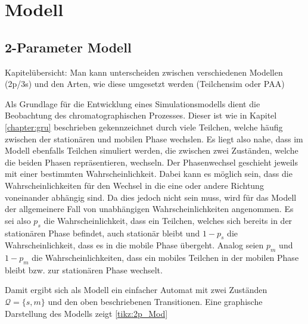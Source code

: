 \chapter{Modell} %
\label{chapter:mod}

\section{2-Parameter Modell}
\label{chapter:mod:2p}


Kapitelübersicht: Man kann unterscheiden zwischen verschiedenen Modellen (2p/3s) und den Arten, wie diese umgesetzt werden (Teilchensim oder PAA)

Als Grundlage für die Entwicklung eines Simulationsmodells dient die Beobachtung des chromatographischen Prozesses. Dieser ist wie in Kapitel \ref{chapter:gru} beschrieben gekennzeichnet durch viele Teilchen, welche häufig zwischen der stationären und mobilen Phase wechslen. Es liegt also nahe, dass im Modell ebenfalls Teilchen simuliert werden, die zwischen zwei Zuständen, welche die beiden Phasen repräsentieren, wechseln. Der Phasenwechsel geschieht jeweils mit einer bestimmten Wahrscheinlichkeit. Dabei kann es möglich sein, dass die Wahrscheinlichkeiten für den Wechsel in die eine oder andere Richtung voneinander abhängig sind. Da dies jedoch nicht sein muss, wird für das Modell der allgemeinere Fall von unabhängigen Wahrscheinlichkeiten angenommen. Es sei also $p_s$ die Wahrscheinlichkeit, dass ein Teilchen, welches sich bereits in der stationären Phase befindet, auch stationär bleibt und $1-p_s$ die Wahrscheinlichkeit, dass es in die mobile Phase übergeht. Analog seien $p_m$ und $1-p_m$ die Wahrscheinlichkeiten, dass ein mobiles Teilchen in der mobilen Phase bleibt bzw. zur stationären Phase wechselt. 


Damit ergibt sich als Modell ein einfacher Automat mit zwei Zuständen $\mathcal{Q} = \{s, m\}$ und den oben beschriebenen Transitionen. Eine graphische Darstellung des Modells zeigt \ref{tikz:2p_Mod} 


